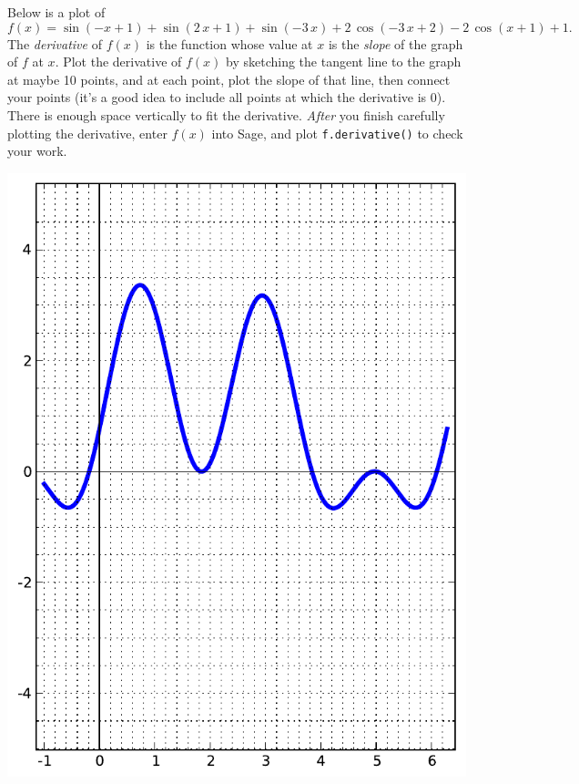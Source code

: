 Below is a plot of $$f(x)=\sin\left(-x + 1\right) + \sin\left(2 \, x + 1\right) + \sin\left(-3 \, x\right) + 2 \, \cos\left(-3 \, x + 2\right) - 2 \, \cos\left(x + 1\right) + 1.$$  The {\em \color{red}derivative} of $f(x)$ is the function whose value at $x$ is the {\em slope} of the graph of $f$ at $x$.  Plot the derivative of $f(x)$ by sketching the tangent line to the graph at maybe 10 points, and at each point, plot the slope of that line, then connect your points (it's a good idea to include all points at which the derivative is 0).  There is enough space vertically to fit the derivative.  {\em After} you finish carefully plotting the derivative, enter $f(x)$ into Sage, and plot {\color{blue}\verb|f.derivative()|} to check your work.
\begin{center}\includegraphics{functions/85.pdf}\end{center}\newpage

